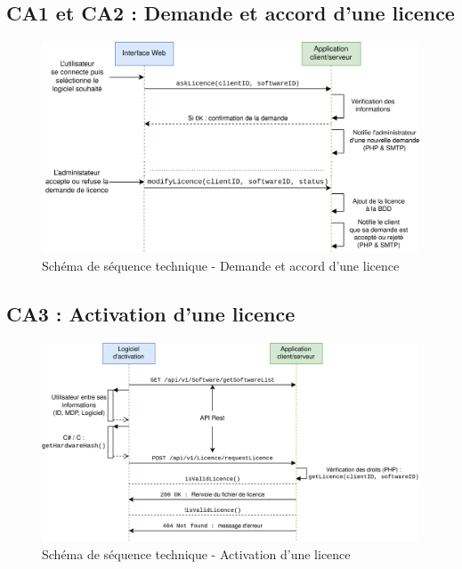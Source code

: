 \subsection{CA1 et CA2 : Demande et accord d'une licence}
\begin{figure}[!h]
    \centering
    \includegraphics[width=\textwidth]{../png/SSD-demande-licence.png}
    \caption{Schéma de séquence technique - Demande et accord d'une licence}
\end{figure}
\newpage

\subsection{CA3 : Activation d'une licence}
\begin{figure}[!h]
    \centering
    \includegraphics[width=15cm]{../png/SSD-logiciel-activation.png}
    \caption{Schéma de séquence technique - Activation d'une licence}
\end{figure}

